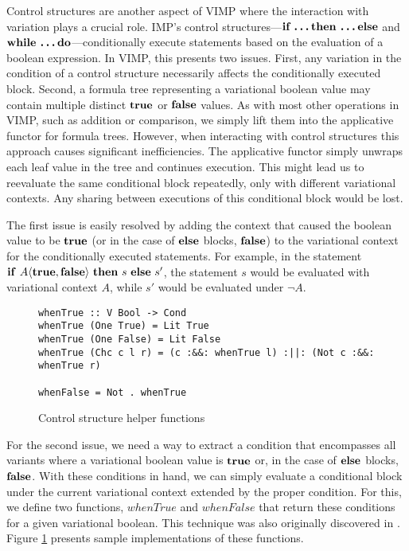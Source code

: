 \documentclass[12pt,oneside]{book}
\newcommand{\tagtree}[3]{#1 \langle #2, #3 \rangle}
\begin{document}
Control structures are another aspect of VIMP where the interaction with variation plays a crucial role. IMP's control structures---$\textbf{\textup{\textrm{if \ldots then \ldots else}}}$ and $\textbf{\textup{\textrm{while \ldots do}}}$---conditionally execute statements based on the evaluation of a boolean expression. In VIMP, this presents two issues. First, any variation in the condition of a control structure
necessarily affects the conditionally executed block. Second, a formula tree representing a variational boolean
value may contain multiple distinct $\textbf{\textup{\textrm{true}}}$ or $\textbf{\textup{\textrm{false}}}$ values. As with most other operations in VIMP, such as addition or comparison, we simply lift them into the applicative functor for formula trees.
However, when interacting with control structures this approach causes significant inefficiencies. The applicative functor simply unwraps each leaf value in the tree
and continues execution. This might lead us to reevaluate the same conditional block repeatedly, only with different variational contexts. Any sharing between executions of this
conditional block would be lost. 

The first issue is easily resolved by adding the context that caused the boolean value to be $\textbf{\textup{\textrm{true}}}$ (or in the case of $\textbf{\textup{\textrm{else}}}$ blocks, $\textbf{\textup{\textrm{false}}}$)
to the variational context for the conditionally executed statements. For example, in the statement
$\CCkeyw{if}\ \tagtree{A}{\CCkeyw{true}}{\CCkeyw{false}}\ \CCkeyw{then}\ s\ \CCkeyw{else}\ s'$, the statement $s$ would be evaluated with variational context $A$, while
$s'$ would be evaluated under $\neg A$.

\begin{figure}
\begin{lstlisting}
whenTrue :: V Bool -> Cond
whenTrue (One True) = Lit True
whenTrue (One False) = Lit False
whenTrue (Chc c l r) = (c :&&: whenTrue l) :||: (Not c :&&: whenTrue r)

whenFalse = Not . whenTrue
\end{lstlisting}
\caption{Control structure helper functions}
\label{fig:when}
\end{figure}

For the second issue, we need a way to extract a condition that encompasses all variants where a variational boolean value is $\textbf{\textup{\textrm{true}}}$ or, in the case of $\textbf{\textup{\textrm{else}}}$ blocks,
$\textbf{\textup{\textrm{false}}}$. With these conditions in hand, we can simply evaluate a conditional block under the current variational context extended by the proper condition. For this, we define two functions, $\mathit{whenTrue}$ and $\mathit{whenFalse}$ that return these conditions for a given variational boolean.
This technique was also originally discovered in \cite{varwhile}.  Figure \ref{fig:when} presents sample implementations of these functions.
\end{document}

